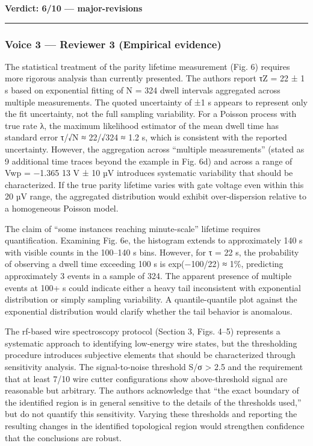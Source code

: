 \documentclass[10pt,letterpaper]{article}
\begin{document}
\textbf{Verdict: 6/10 --- major-revisions}

\begin{center}\rule{0.5\linewidth}{0.5pt}\end{center}

\hypertarget{voice-3-reviewer-3-empirical-evidence}{%
\subsubsection{Voice 3 --- Reviewer 3 (Empirical evidence)}\label{voice-3-reviewer-3-empirical-evidence}}

The statistical treatment of the parity lifetime measurement (Fig. 6) requires more rigorous analysis than currently presented. The authors report τZ = 22 ± 1 s based on exponential fitting of N = 324 dwell intervals aggregated across multiple measurements. The quoted uncertainty of ±1 s appears to represent only the fit uncertainty, not the full sampling variability. For a Poisson process with true rate λ, the maximum likelihood estimator of the mean dwell time has standard error τ/√N ≈ 22/√324 ≈ 1.2 s, which is consistent with the reported uncertainty. However, the aggregation across ``multiple measurements'' (stated as 9 additional time traces beyond the example in Fig. 6d) and across a range of Vwp = −1.365 13 V ± 10 µV introduces systematic variability that should be characterized. If the true parity lifetime varies with gate voltage even within this 20 µV range, the aggregated distribution would exhibit over-dispersion relative to a homogeneous Poisson model.

The claim of ``some instances reaching minute-scale'' lifetime requires quantification. Examining Fig. 6e, the histogram extends to approximately 140 s with visible counts in the 100--140 s bins. However, for τ = 22 s, the probability of observing a dwell time exceeding 100 s is exp(−100/22) ≈ 1\%, predicting approximately 3 events in a sample of 324. The apparent presence of multiple events at 100+ s could indicate either a heavy tail inconsistent with exponential distribution or simply sampling variability. A quantile-quantile plot against the exponential distribution would clarify whether the tail behavior is anomalous.

The rf-based wire spectroscopy protocol (Section 3, Figs. 4--5) represents a systematic approach to identifying low-energy wire states, but the thresholding procedure introduces subjective elements that should be characterized through sensitivity analysis. The signal-to-noise threshold S/σ \textgreater{} 2.5 and the requirement that at least 7/10 wire cutter configurations show above-threshold signal are reasonable but arbitrary. The authors acknowledge that ``the exact boundary of the identified region is in general sensitive to the details of the thresholds used,'' but do not quantify this sensitivity. Varying these thresholds and reporting the resulting changes in the identified topological region would strengthen confidence that the conclusions are robust.
\end{document}
